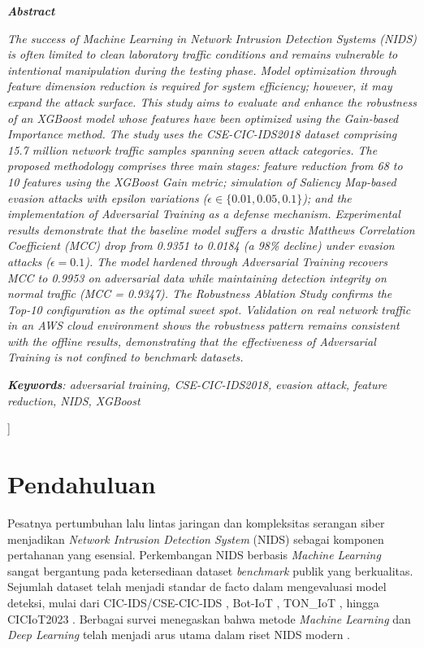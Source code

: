 \documentclass[10pt,twocolumn,a4paper]{extarticle}
\begin{document}
\begin{@twocolumnfalse}
  \begin{center}\textbf{\textit{Abstract}}\end{center}
  \noindent\small\itshape
  The success of Machine Learning in Network Intrusion Detection Systems (NIDS) is often limited to clean laboratory traffic conditions and remains vulnerable to intentional manipulation during the testing phase. Model optimization through feature dimension reduction is required for system efficiency; however, it may expand the attack surface. This study aims to evaluate and enhance the robustness of an XGBoost model whose features have been optimized using the Gain-based Importance method. The study uses the CSE-CIC-IDS2018 dataset comprising 15.7 million network traffic samples spanning seven attack categories. The proposed methodology comprises three main stages: feature reduction from 68 to 10 features using the XGBoost Gain metric; simulation of Saliency Map-based evasion attacks with epsilon variations ($\epsilon \in \{0.01, 0.05, 0.1\}$); and the implementation of Adversarial Training as a defense mechanism. Experimental results demonstrate that the baseline model suffers a drastic Matthews Correlation Coefficient (MCC) drop from 0.9351 to 0.0184 (a 98\% decline) under evasion attacks ($\epsilon = 0.1$). The model hardened through Adversarial Training recovers MCC to 0.9953 on adversarial data while maintaining detection integrity on normal traffic (MCC = 0.9347). The Robustness Ablation Study confirms the Top-10 configuration as the optimal sweet spot. Validation on real network traffic in an AWS cloud environment shows the robustness pattern remains consistent with the offline results, demonstrating that the effectiveness of Adversarial Training is not confined to benchmark datasets.

  \vspace{6pt}
  \noindent\small\itshape\textbf{Keywords}: adversarial training, CSE-CIC-IDS2018, evasion attack, feature reduction, NIDS, XGBoost

  \vspace{14pt}
  \end{@twocolumnfalse}
]

\section{Pendahuluan}
Pesatnya pertumbuhan lalu lintas jaringan dan kompleksitas serangan siber menjadikan \textit{Network Intrusion Detection System} (NIDS) sebagai komponen pertahanan yang esensial. Perkembangan NIDS berbasis \textit{Machine Learning} sangat bergantung pada ketersediaan dataset \textit{benchmark} publik yang berkualitas. Sejumlah dataset telah menjadi standar de facto dalam mengevaluasi model deteksi, mulai dari CIC-IDS/CSE-CIC-IDS \citep{ref_cicids}, Bot-IoT \citep{ref_botiot}, TON\_IoT \citep{ref_toniot}, hingga CICIoT2023 \citep{ref_ciciot}. Berbagai survei menegaskan bahwa metode \textit{Machine Learning} dan \textit{Deep Learning} telah menjadi arus utama dalam riset NIDS modern \citep{ref_review_gan,ref_tutorial_gan}.
\end{document}
